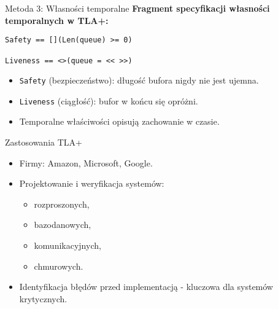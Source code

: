 \documentclass{beamer}
\begin{document}
\begin{frame}[fragile]{Metoda 3: Własności temporalne}
  \textbf{Fragment specyfikacji własności temporalnych w TLA+:}
  \vspace{0.5em}
  \begin{verbatim}
Safety == [](Len(queue) >= 0)

Liveness == <>(queue = << >>)
  \end{verbatim}

  \vspace{0.1em}
  \begin{itemize}
    \item \texttt{Safety} (bezpieczeństwo): długość bufora nigdy nie jest ujemna.
    \item \texttt{Liveness} (ciągłość): bufor w końcu się opróżni.
    \item Temporalne właściwości opisują zachowanie w czasie.
  \end{itemize}
\end{frame}

\begin{frame}{Zastosowania TLA+}
  \begin{itemize}
      \item Firmy: Amazon, Microsoft, Google.
      \item Projektowanie i weryfikacja systemów:
      \begin{itemize}
          \item rozproszonych,
          \item bazodanowych,
          \item komunikacyjnych,
          \item chmurowych.
      \end{itemize}
      \item Identyfikacja błędów przed implementacją - kluczowa dla systemów krytycznych.
  \end{itemize}
\end{frame}
\end{document}
